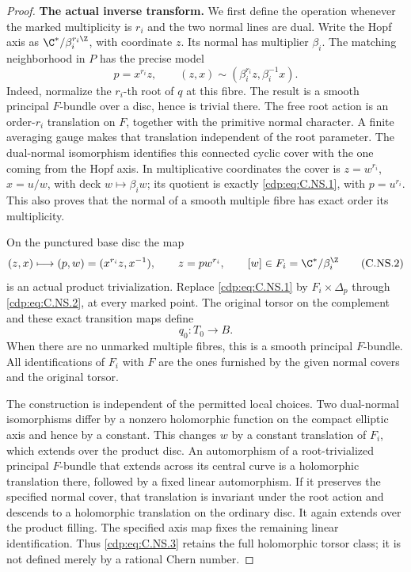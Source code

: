 \begin{proof}
\par\medskip\noindent\textbf{The actual inverse transform.}
We first define the operation whenever the marked
multiplicity is $r_i$ and the two normal lines are dual.
Write the Hopf axis as $\C^*/\beta_i^{r_i\Z}$, with
coordinate $z$. Its normal has multiplier $\beta_i$.
The matching neighborhood in $P$ has the precise model
\[
 p=x^{r_i}z,\qquad
 (z,x)\sim(\beta_i^{r_i}z,\beta_i^{-1}x).
                                                        \tag{C.NS.1}\label{cdp:eq:C.NS.1}
\]
Indeed, normalize the $r_i$-th root of $q$ at this fibre.
The result is a smooth principal $F$-bundle over a disc,
hence is trivial there. The free root action is an
order-$r_i$ translation on $F$, together with the
primitive normal character. A finite averaging gauge
makes that translation independent of the root
parameter. The dual-normal isomorphism identifies this
connected cyclic cover with the one coming from the
Hopf axis. In multiplicative coordinates the cover is
$z=w^{r_i}$, $x=u/w$, with deck $w\mapsto\beta_i w$;
its quotient is exactly \eqref{cdp:eq:C.NS.1}, with $p=u^{r_i}$.
This also proves that the normal of a smooth
multiple fibre has exact order its multiplicity.

On the punctured base disc the map
\[
       (z,x)\longmapsto(p,w)=(x^{r_i}z,x^{-1}),
       \qquad z=pw^{r_i},
       \qquad [w]\in F_i=\C^*/\beta_i^{\Z}
                                                        \tag{C.NS.2}\label{cdp:eq:C.NS.2}
\]
is an actual product trivialization. Replace \eqref{cdp:eq:C.NS.1}
by $F_i\times\Delta_p$ through \eqref{cdp:eq:C.NS.2}, at every
marked point. The original torsor on the complement
and these exact transition maps define
\[
                             q_0:T_0\longrightarrow B.
                                                        \tag{C.NS.3}\label{cdp:eq:C.NS.3}
\]
When there are no unmarked multiple fibres, this is a
smooth principal $F$-bundle. All identifications of
$F_i$ with $F$ are the ones furnished by the given
normal covers and the original torsor.

The construction is independent of the permitted local
choices. Two dual-normal isomorphisms differ by a
nonzero holomorphic function on the compact elliptic
axis and hence by a constant. This changes $w$ by a
constant translation of $F_i$, which extends over the
product disc. An automorphism of a root-trivialized
principal $F$-bundle that extends across its central
curve is a holomorphic translation there, followed by
a fixed linear automorphism. If it preserves the
specified normal cover, that translation is invariant
under the root action and descends to a holomorphic
translation on the ordinary disc. It again extends
over the product filling. The specified axis map
fixes the remaining linear identification. Thus
\eqref{cdp:eq:C.NS.3} retains the full holomorphic torsor class;
it is not defined merely by a rational Chern number.


\end{proof}
